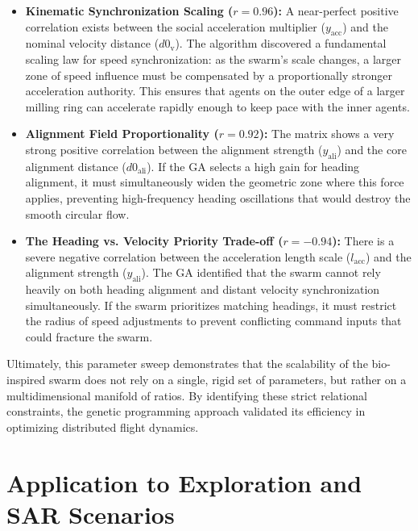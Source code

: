 \documentclass[conference]{IEEEtran}
\begin{document}
\begin{itemize}
	\item \textbf{Kinematic Synchronization Scaling ($r = 0.96$):} A near-perfect positive correlation exists between the social acceleration multiplier ($y_{\text{acc}}$) and the nominal velocity distance ($d0_{\text{v}}$). The algorithm discovered a fundamental scaling law for speed synchronization: as the swarm's scale changes, a larger zone of speed influence must be compensated by a proportionally stronger acceleration authority. This ensures that agents on the outer edge of a larger milling ring can accelerate rapidly enough to keep pace with the inner agents.
	
	\item \textbf{Alignment Field Proportionality ($r = 0.92$):} The matrix shows a very strong positive correlation between the alignment strength ($y_{\text{ali}}$) and the core alignment distance ($d0_{\text{ali}}$). If the GA selects a high gain for heading alignment, it must simultaneously widen the geometric zone where this force applies, preventing high-frequency heading oscillations that would destroy the smooth circular flow.
	
	\item \textbf{The Heading vs. Velocity Priority Trade-off ($r = -0.94$):} There is a severe negative correlation between the acceleration length scale ($l_{\text{acc}}$) and the alignment strength ($y_{\text{ali}}$). The GA identified that the swarm cannot rely heavily on both heading alignment and distant velocity synchronization simultaneously. If the swarm prioritizes matching headings, it must restrict the radius of speed adjustments to prevent conflicting command inputs that could fracture the swarm.
\end{itemize}

Ultimately, this parameter sweep demonstrates that the scalability of the bio-inspired swarm does not rely on a single, rigid set of parameters, but rather on a multidimensional manifold of ratios. By identifying these strict relational constraints, the genetic programming approach validated its efficiency in optimizing distributed flight dynamics.

\section{Application to Exploration and SAR Scenarios}
\label{sec:exploration}
\end{document}
